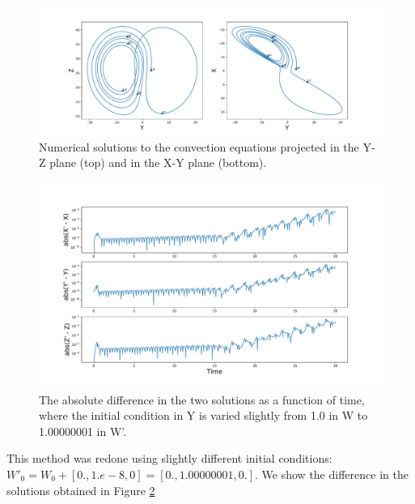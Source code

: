 \documentclass{article}
\begin{document}
\begin{figure}[ht!]
    \centering
    \includegraphics[scale=0.4]{Lorentz_fig2.pdf}
    \caption{Numerical solutions to the convection equations projected in the Y-Z plane (top) and in the X-Y plane (bottom).}
    \label{fig:Lorentz_fig2}
\end{figure}



\begin{figure}[ht]
    \centering
    \includegraphics[scale=0.4]{Error_plot.pdf}
    \caption{The absolute difference in the two solutions as a function of time, where the initial condition in Y is varied slightly from 1.0 in W to 1.00000001 in W'.}
    \label{fig:error_plot}
\end{figure}

This method was redone using slightly different initial conditions: $W'_0 = W_0+[0., 1.e-8, 0] = [0., 1.00000001, 0.]$. We show the difference in the solutions obtained in Figure \ref{fig:error_plot}
\end{document}
